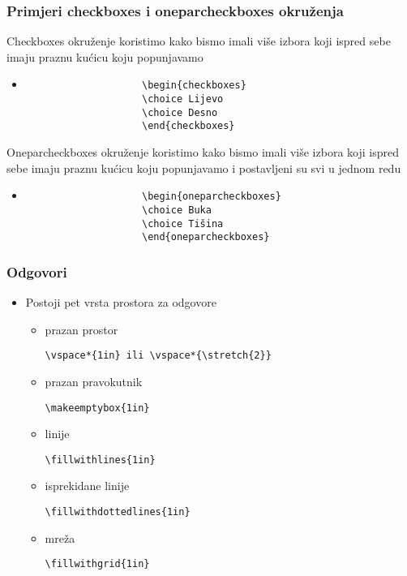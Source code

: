 \documentclass{beamer}
\begin{document}
	\begin{frame}[fragile]
		\frametitle{Primjeri checkboxes i oneparcheckboxes okruženja}
		Checkboxes okruženje koristimo kako bismo imali više izbora koji ispred sebe imaju praznu kućicu koju popunjavamo 
			\begin{itemize}
				\item
					\begin{verbatim}
					\begin{checkboxes}
					\choice Lijevo
					\choice Desno
					\end{checkboxes}
					\end{verbatim}
			\end{itemize}
		Oneparcheckboxes okruženje koristimo kako bismo imali više izbora koji ispred sebe imaju praznu kućicu koju popunjavamo i postavljeni su svi u jednom redu
			\begin{itemize}
				\item
					\begin{verbatim}
					\begin{oneparcheckboxes}
					\choice Buka
					\choice Tišina
					\end{oneparcheckboxes}
					\end{verbatim}
			\end{itemize}
	\end{frame}

	\begin{frame}[fragile]
    	\frametitle{Odgovori}
    	\begin{itemize}
    		\item Postoji pet vrsta prostora za odgovore
    		\begin{itemize}
    			\item prazan prostor \begin{verbatim}\vspace*{1in} ili \vspace*{\stretch{2}}\end{verbatim}
    			\item prazan pravokutnik \begin{verbatim}\makeemptybox{1in}\end{verbatim}
    			\item linije \begin{verbatim}\fillwithlines{1in}\end{verbatim}
    			\item isprekidane linije \begin{verbatim}\fillwithdottedlines{1in}\end{verbatim}
    			\item mreža \begin{verbatim}\fillwithgrid{1in}\end{verbatim}
    		\end{itemize}
    	\end{itemize}	
    \end{frame}
\end{document}
